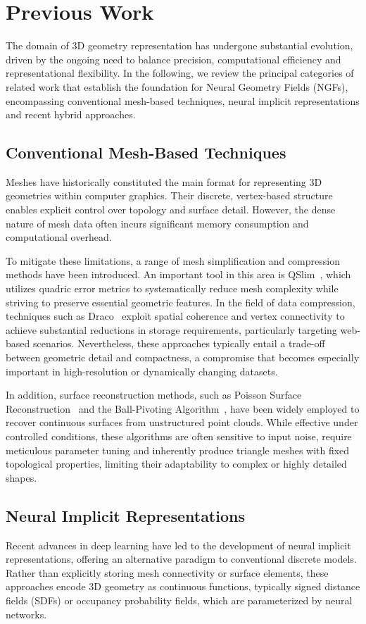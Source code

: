 \section{Previous Work}\label{sec:PreviousWork}
The domain of 3D geometry representation has undergone substantial evolution, driven by the ongoing need to balance precision, computational efficiency and representational flexibility.
In the following, we review the principal categories of related work that establish the foundation for Neural Geometry Fields (NGFs), encompassing conventional mesh-based techniques, neural implicit representations and recent hybrid approaches.

\subsection{Conventional Mesh-Based Techniques}
Meshes have historically constituted the main format for representing 3D geometries within computer graphics.
Their discrete, vertex-based structure enables explicit control over topology and surface detail.
However, the dense nature of mesh data often incurs significant memory consumption and computational overhead.

To mitigate these limitations, a range of mesh simplification and compression methods have been introduced.
An important tool in this area is QSlim~\cite{garland1997}, which utilizes quadric error metrics to systematically reduce mesh complexity while striving to preserve essential geometric features.
In the field of data compression, techniques such as Draco~\cite{sajnani2020} exploit spatial coherence and vertex connectivity to achieve substantial reductions in storage requirements, particularly targeting web-based scenarios.
Nevertheless, these approaches typically entail a trade-off between geometric detail and compactness, a compromise that becomes especially important in high-resolution or dynamically changing datasets.

In addition, surface reconstruction methods, such as Poisson Surface Reconstruction~\cite{kazhdan2006} and the Ball-Pivoting Algorithm~\cite{bernardini1999}, have been widely employed to recover continuous surfaces from unstructured point clouds.
While effective under controlled conditions, these algorithms are often sensitive to input noise, require meticulous parameter tuning and inherently produce triangle meshes with fixed topological properties, limiting their adaptability to complex or highly detailed shapes.

\subsection{Neural Implicit Representations}
Recent advances in deep learning have led to the development of neural implicit representations, offering an alternative paradigm to conventional discrete models.
Rather than explicitly storing mesh connectivity or surface elements, these approaches encode 3D geometry as continuous functions, typically signed distance fields (SDFs) or occupancy probability fields, which are parameterized by neural networks.

